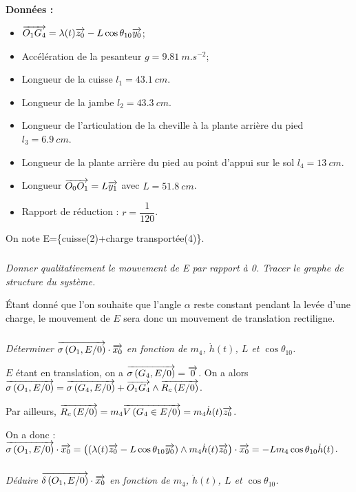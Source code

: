 \documentclass[10pt,fleqn]{article} %
\begin{document}
\begin{multicols}{2}
\noindent\textbf{Données :}
\begin{itemize}
\item $\overrightarrow{O_1G_4}=\lambda(t)\overrightarrow{z_0}-L\cos\theta_{10}\overrightarrow{y_0}$;
\item Accélération de la pesanteur $g=\SI{9,81}{m.s^{-2}}$;
\item Longueur de la cuisse $l_1 = \SI{43,1}{cm}$.
\item Longueur de la jambe $l_2 = \SI{43,3}{cm}$.
\item Longueur de l'articulation de la cheville à la plante arrière du pied $l_3 = \SI{6,9}{cm}$.
\item Longueur de la plante arrière du pied au point d’appui sur le sol $l_4 = \SI{13}{cm}$.
\item Longueur $\overrightarrow{O_0O_1}=L\overrightarrow{y_1}$ avec $L=\SI{51,8}{cm}$.
\item Rapport de réduction : $r=\dfrac{1}{120}$.
\end{itemize}

On note E=\{cuisse(2)+charge transportée(4)\}. 

\subparagraph{} \textit{Donner qualitativement le mouvement de E par rapport à 0. Tracer le graphe de structure du système.}

\ifprof
\begin{corrige}
Étant donné que l'on souhaite que l'angle $\alpha$ reste constant pendant la levée d'une charge, le mouvement de $E$ sera donc un mouvement de translation rectiligne.  
\end{corrige}
\else
\fi


\subparagraph{} \textit{Déterminer $\overrightarrow{\sigma \left( {O_1}, {E} /{0}\right)}\cdot \overrightarrow{x_0}$ en fonction de $m_4$, $\dot{h}(t)$, $L$ et $\cos\theta_{10}$.}

\ifprof
\begin{corrige}
$E$ étant en translation, on a $\overrightarrow{\sigma \left( {G_4}, {E} /{0}\right)}=\overrightarrow{0}$. On a alors 
 $\overrightarrow{\sigma \left( {O_1}, {E} /{0}\right)}=\overrightarrow{\sigma \left( {G_4}, {E} /{0}\right)}+\overrightarrow{O_1G_4}\wedge\overrightarrow{R_c \left( {E}/ {0}\right)}$.

Par ailleurs, $\overrightarrow{R_c \left( {E}/ {0}\right)}=m_4\overrightarrow{V\left( {G_4} \in {E}/{0}\right)} = m_4\dot{h}(t)\overrightarrow{z_0}$. 

On a donc :
$ \overrightarrow{\sigma \left( {O_1}, {E} /{0}\right)}\cdot \overrightarrow{x_0} 
= \left(\left( \lambda(t)\overrightarrow{z_0}-L\cos\theta_{10}\overrightarrow{y_0}\right)\wedge m_4\dot{h}(t)\overrightarrow{z_0}\right) \cdot \overrightarrow{x_0}
=  -Lm_4\cos\theta_{10}\dot{h}(t)$.
 
 
\end{corrige}
\else
\fi



\subparagraph{} \textit{Déduire $\overrightarrow{\delta \left( {O_1}, {E} /{0}\right)}\cdot \overrightarrow{x_0}$ en fonction de $m_4$, $\ddot{h}(t)$, $L$ et $\cos\theta_{10}$.}


\end{multicols}
\end{document}
